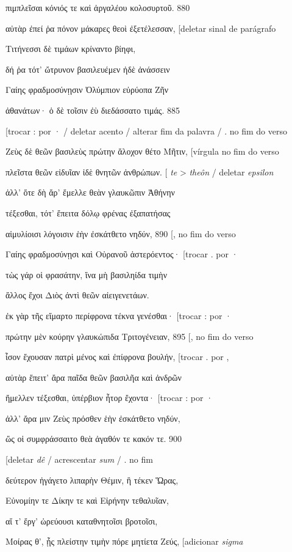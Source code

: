 πιμπλεῖσαι κόνιός τε καὶ ἀργαλέου κολοσυρτοῦ. 880

αὐτὰρ ἐπεί ῥα πόνον μάκαρες θεοὶ ἐξετέλεσσαν, {[}deletar sinal de
parágrafo

Τιτήνεσσι δὲ τιμάων κρίναντο βίηφι,

δή ῥα τότ' ὤτρυνον βασιλευέμεν ἠδὲ ἀνάσσειν

Γαίης φραδμοσύνῃσιν Ὀλύμπιον εὐρύοπα Ζῆν

ἀθανάτων· ὁ δὲ τοῖσιν ἐὺ διεδάσσατο τιμάς. 885

{[}trocar : por · / deletar acento / alterar fim da palavra / . no fim
do verso

Ζεὺς δὲ θεῶν βασιλεὺς πρώτην ἄλοχον θέτο Μῆτιν, {[}vírgula no fim do
verso

πλεῖστα θεῶν εἰδυῖαν ἰδὲ θνητῶν ἀνθρώπων. {[} \emph{te} \textgreater{}
\emph{theôn} / deletar \emph{epsilon}

ἀλλ' ὅτε δὴ ἄρ' ἔμελλε θεὰν γλαυκῶπιν Ἀθήνην

τέξεσθαι, τότ' ἔπειτα δόλῳ φρένας ἐξαπατήσας

αἱμυλίοισι λόγοισιν ἑὴν ἐσκάτθετο νηδύν, 890 {[}, no fim do verso

Γαίης φραδμοσύνῃσι καὶ Οὐρανοῦ ἀστερόεντος· {[}trocar . por ·

τὼς γάρ οἱ φρασάτην, ἵνα μὴ βασιληίδα τιμὴν

ἄλλος ἔχοι Διὸς ἀντὶ θεῶν αἰειγενετάων.

ἐκ γὰρ τῆς εἵμαρτο περίφρονα τέκνα γενέσθαι· {[}trocar : por ·

πρώτην μὲν κούρην γλαυκώπιδα Τριτογένειαν, 895 {[}, no fim do verso

ἶσον ἔχουσαν πατρὶ μένος καὶ ἐπίφρονα βουλήν, {[}trocar . por ,

αὐτὰρ ἔπειτ' ἄρα παῖδα θεῶν βασιλῆα καὶ ἀνδρῶν

ἤμελλεν τέξεσθαι, ὑπέρβιον ἦτορ ἔχοντα· {[}trocar : por ·

ἀλλ' ἄρα μιν Ζεὺς πρόσθεν ἑὴν ἐσκάτθετο νηδύν,

ὥς οἱ συμφράσσαιτο θεὰ ἀγαθόν τε κακόν τε. 900

{[}deletar \emph{dê} / acrescentar \emph{sum} / . no fim

δεύτερον ἠγάγετο λιπαρὴν Θέμιν, ἣ τέκεν Ὥρας,

Εὐνομίην τε Δίκην τε καὶ Εἰρήνην τεθαλυῖαν,

αἵ τ' ἔργ' ὠρεύουσι καταθνητοῖσι βροτοῖσι,

Μοίρας θ', ᾗς πλείστην τιμὴν πόρε μητίετα Ζεύς, {[}adicionar
\emph{sigma}

